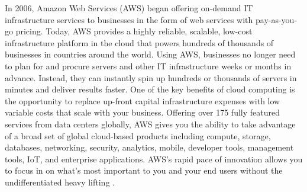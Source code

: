 In 2006, Amazon Web Services (AWS) began offering on-demand IT infrastructure services to businesses in the form of web services with pay-as-you-go pricing. Today, AWS provides a highly reliable, scalable, low-cost infrastructure platform in the cloud that powers hundreds of thousands of businesses in countries around the world. Using AWS, businesses no longer need to plan for and procure servers and other IT infrastructure weeks or months in advance. Instead, they can instantly spin up hundreds or thousands of servers in minutes and deliver results faster. One of the key benefits of cloud computing is the opportunity to replace up-front capital infrastructure expenses with low variable costs that scale with your business. Offering over 175 fully featured services from data centers globally, AWS gives you the ability to take advantage of a broad set of global cloud-based products including compute, storage, databases, networking, security, analytics, mobile, developer tools, management tools, IoT, and enterprise applications. AWS's rapid pace of innovation allows you to focus in on what's most important to you and your end users without the undifferentiated heavy lifting \cite{AboutAWS}.

